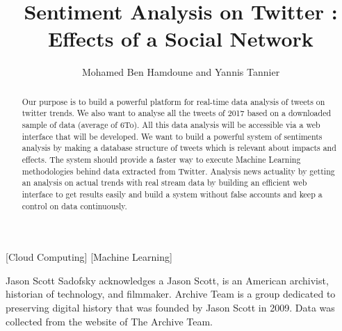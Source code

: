 \documentclass{acmtog} %
\begin{document}

\title{Sentiment Analysis on Twitter : Effects of a Social Network} %

\author{Mohamed Ben Hamdoune {\upshape and} Yannis Tannier
}

[Cloud Computing]
[Machine Learning]




\maketitle

\begin{bottomstuff}
Jason Scott Sadofsky acknowledges a Jason Scott, is an American archivist, historian of technology, and filmmaker. Archive Team is a group dedicated to preserving digital history that was founded by Jason Scott in 2009. Data was collected from the website of The Archive Team.
\end{bottomstuff}


\begin{abstract}
Our purpose is to build a powerful platform for real-time data analysis of tweets on twitter trends. We also want to analyse all the tweets of 2017 based on a downloaded sample of data (average of 6To). All this data analysis will be accessible via a web interface that will be developed. We want to build a powerful system of sentiments analysis by making a database structure of tweets which is relevant about impacts and effects. The system should provide a faster way to execute Machine Learning methodologies behind data extracted from Twitter. Analysis news actuality by getting an analysis on actual trends with real stream data by building an efficient web interface to get results easily and build a system without false accounts and keep a control on data continuously.
\end{abstract}
\end{document}
